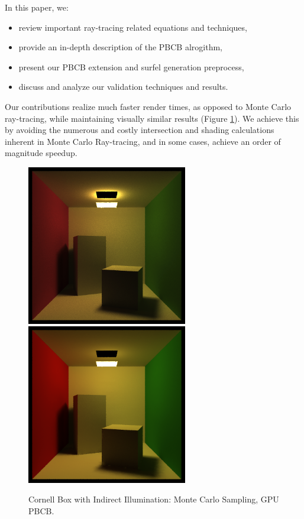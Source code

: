 \noindent In this paper, we:
\begin{itemize}
\item review important ray-tracing related equations and techniques,
\item provide an in-depth description of the PBCB alrogithm,
\item present our PBCB extension and surfel generation preprocess,
\item discuss and analyze our validation techniques and results.
\end{itemize}

Our contributions realize much faster render times, as opposed to Monte Carlo ray-tracing, while maintaining visually similar results (Figure \ref{fig:compare_techniques}). We achieve this by avoiding the numerous and costly intersection and shading calculations inherent in Monte Carlo Ray-tracing, and in some cases, achieve an order of magnitude speedup.

\begin{figure}[h!]
    \centering
    \includegraphics[width=70mm]{../img/cornell_simp_area_mcs.png}
    \includegraphics[width=70mm]{../img/cornell_simp_area_srf.png}
    \caption{Cornell Box with Indirect Illumination: Monte Carlo Sampling, GPU PBCB.}
    \label{fig:compare_techniques}
\end{figure}

